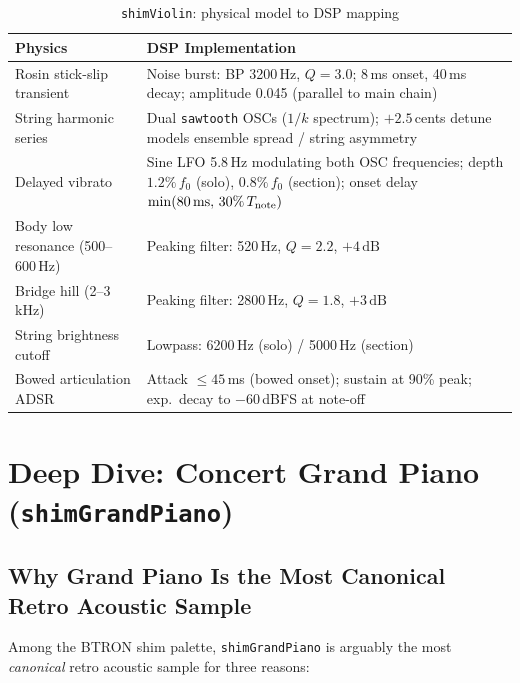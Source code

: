 \documentclass[10pt,journal,compsoc,twocolumn]{article}
\begin{document}
\begin{table}[h]
\centering
\caption{\texttt{shimViolin}: physical model to DSP mapping}
\label{tab:violin_components}
\scriptsize
\setlength{\tabcolsep}{3pt}
\renewcommand{\arraystretch}{1.12}
\begin{tabularx}{\columnwidth}{@{}
  >{\raggedright\arraybackslash}p{2.0cm}
  >{\raggedright\arraybackslash}X
@{}}
\toprule
\textbf{Physics} & \textbf{DSP Implementation} \\
\midrule
Rosin stick-slip transient &
Noise burst: BP 3200\,Hz, $Q=3.0$; 8\,ms onset, 40\,ms decay;
amplitude 0.045 (parallel to main chain) \\
String harmonic series &
Dual \texttt{sawtooth} OSCs ($1/k$ spectrum); $+2.5$\,cents detune
models ensemble spread / string asymmetry \\
Delayed vibrato &
Sine LFO 5.8\,Hz modulating both OSC frequencies; depth
$1.2\%\,f_0$ (solo), $0.8\%\,f_0$ (section); onset delay
$\min(80\,\text{ms},\,30\%\,T_{\rm note})$ \\
Body low resonance (500--600\,Hz) &
Peaking filter: 520\,Hz, $Q=2.2$, $+4\,\text{dB}$ \\
Bridge hill (2--3\,kHz) &
Peaking filter: 2800\,Hz, $Q=1.8$, $+3\,\text{dB}$ \\
String brightness cutoff &
Lowpass: 6200\,Hz (solo) / 5000\,Hz (section) \\
Bowed articulation ADSR &
Attack $\leq 45$\,ms (bowed onset); sustain at 90\% peak;
exp.\ decay to $-60$\,dBFS at note-off \\
\bottomrule
\end{tabularx}
\end{table}

\section{Deep Dive: Concert Grand Piano (\texttt{shimGrandPiano})}
\label{sec:piano}

\subsection{Why Grand Piano Is the Most Canonical Retro Acoustic Sample}

Among the BTRON shim palette, \texttt{shimGrandPiano} is arguably the most
\emph{canonical} retro acoustic sample for three reasons:
\end{document}
